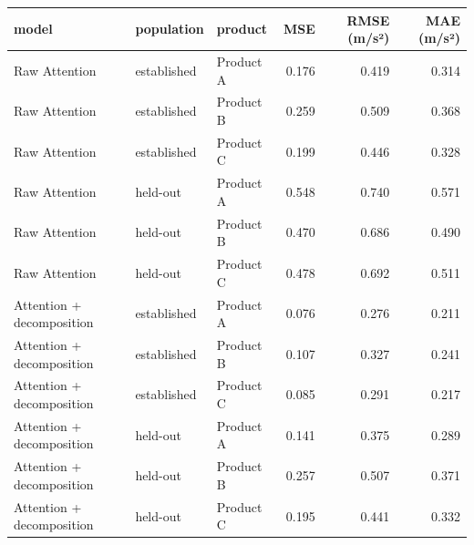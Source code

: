 \begin{tabular}{lllrrr}
\toprule
model & population & product & MSE & RMSE (m/s²) & MAE (m/s²) \\
\midrule
Raw Attention & established & Product A & 0.176 & 0.419 & 0.314 \\
Raw Attention & established & Product B & 0.259 & 0.509 & 0.368 \\
Raw Attention & established & Product C & 0.199 & 0.446 & 0.328 \\
Raw Attention & held-out & Product A & 0.548 & 0.740 & 0.571 \\
Raw Attention & held-out & Product B & 0.470 & 0.686 & 0.490 \\
Raw Attention & held-out & Product C & 0.478 & 0.692 & 0.511 \\
Attention + decomposition & established & Product A & 0.076 & 0.276 & 0.211 \\
Attention + decomposition & established & Product B & 0.107 & 0.327 & 0.241 \\
Attention + decomposition & established & Product C & 0.085 & 0.291 & 0.217 \\
Attention + decomposition & held-out & Product A & 0.141 & 0.375 & 0.289 \\
Attention + decomposition & held-out & Product B & 0.257 & 0.507 & 0.371 \\
Attention + decomposition & held-out & Product C & 0.195 & 0.441 & 0.332 \\
\bottomrule
\end{tabular}
